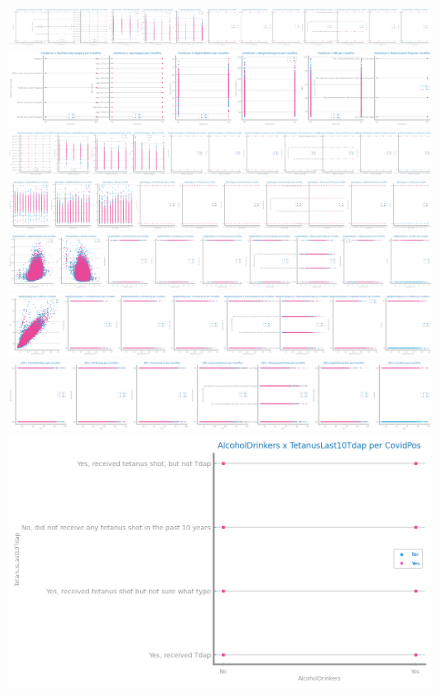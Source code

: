 \documentclass[10pt]{extarticle}
\begin{document}
\begin{figure}[H]
\includegraphics[scale=0.05]{images/dataset1/data_profiling/CovidPos_sparsity_ECigaretteUsage_per_class.png}
\includegraphics[scale=0.05]{images/dataset1/data_profiling/CovidPos_sparsity_ChestScan_per_class.png}
\includegraphics[scale=0.05]{images/dataset1/data_profiling/CovidPos_sparsity_RaceEthnicityCategory_per_class.png}
\includegraphics[scale=0.05]{images/dataset1/data_profiling/CovidPos_sparsity_AgeCategory_per_class.png}
\includegraphics[scale=0.05]{images/dataset1/data_profiling/CovidPos_sparsity_HeightInMeters_per_class.png}
\includegraphics[scale=0.05]{images/dataset1/data_profiling/CovidPos_sparsity_WeightInKilograms_per_class.png}
\includegraphics[scale=0.05]{images/dataset1/data_profiling/CovidPos_sparsity_BMI_per_class.png}
\includegraphics[scale=0.05]{images/dataset1/data_profiling/CovidPos_sparsity_AlcoholDrinkers_per_class.png}

\end{figure}
\end{document}
